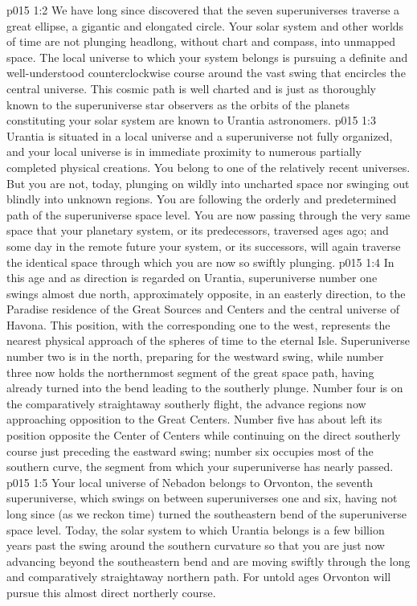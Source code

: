 \vs p015 1:2 We have long since discovered that the seven superuniverses traverse a great ellipse, a gigantic and elongated circle. Your solar system and other worlds of time are not plunging headlong, without chart and compass, into unmapped space. The local universe to which your system belongs is pursuing a definite and well\hyp{}understood counterclockwise course around the vast swing that encircles the central universe. This cosmic path is well charted and is just as thoroughly known to the superuniverse star observers as the orbits of the planets constituting your solar system are known to Urantia astronomers.
\vs p015 1:3 Urantia is situated in a local universe and a superuniverse not fully organized, and your local universe is in immediate proximity to numerous partially completed physical creations. You belong to one of the relatively recent universes. But you are not, today, plunging on wildly into uncharted space nor swinging out blindly into unknown regions. You are following the orderly and predetermined path of the superuniverse space level. You are now passing through the very same space that your planetary system, or its predecessors, traversed ages ago; and some day in the remote future your system, or its successors, will again traverse the identical space through which you are now so swiftly plunging.
\vs p015 1:4 \pc In this age and as direction is regarded on Urantia, superuniverse number one swings almost due north, approximately opposite, in an easterly direction, to the Paradise residence of the Great Sources and Centers and the central universe of Havona. This position, with the corresponding one to the west, represents the nearest physical approach of the spheres of time to the eternal Isle. Superuniverse number two is in the north, preparing for the westward swing, while number three now holds the northernmost segment of the great space path, having already turned into the bend leading to the southerly plunge. Number four is on the comparatively straightaway southerly flight, the advance regions now approaching opposition to the Great Centers. Number five has about left its position opposite the Center of Centers while continuing on the direct southerly course just preceding the eastward swing; number six occupies most of the southern curve, the segment from which your superuniverse has nearly passed.
\vs p015 1:5 Your local universe of Nebadon belongs to Orvonton, the seventh superuniverse, which swings on between superuniverses one and six, having not long since (as we reckon time) turned the southeastern bend of the superuniverse space level. Today, the solar system to which Urantia belongs is a few billion years past the swing around the southern curvature so that you are just now advancing beyond the southeastern bend and are moving swiftly through the long and comparatively straightaway northern path. For untold ages Orvonton will pursue this almost direct northerly course.
